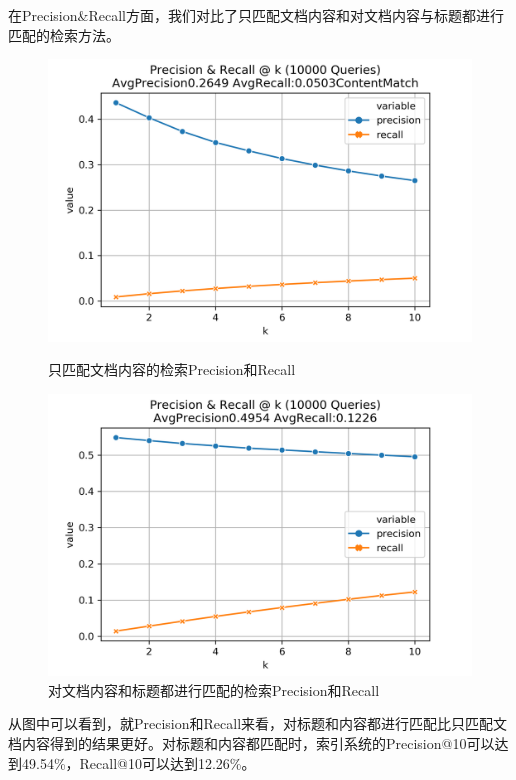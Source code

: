 \documentclass[12pt]{article}
\begin{document}
在Precision\&Recall方面，我们对比了只匹配文档内容和对文档内容与标题都进行匹配的检索方法。
\begin{figure}[H]
	\begin{minipage}[t]{0.5\textwidth}
		\centering
		\includegraphics[scale=0.5]{fig/OnlyContent.png}
		\caption{只匹配文档内容的检索Precision和Recall\label{fig:onlycontent}}
	\end{minipage}
	\qquad
	\begin{minipage}[t]{0.5\textwidth}
		\centering
		\includegraphics[scale=0.5]{fig/Precision-&-Recall-@-k-(10000-Queries).png}
		\caption{对文档内容和标题都进行匹配的检索Precision和Recall\label{fig:titleandcontent}}
	\end{minipage}

\end{figure}

从图中可以看到，就Precision和Recall来看，对标题和内容都进行匹配比只匹配文档内容得到的结果更好。对标题和内容都匹配时，索引系统的Precision@10可以达到49.54\%，Recall@10可以达到12.26\%。
\end{document}
